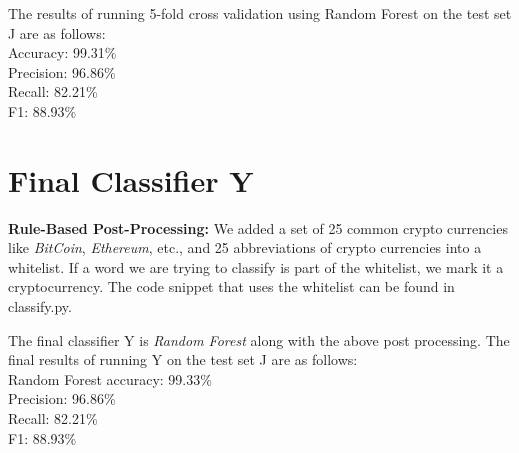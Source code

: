 \documentclass[12pt,letterpaper]{article}
\begin{document}
The results of running 5-fold cross validation using Random Forest on the test set J are as follows:\\
Accuracy: 99.31\%\\
Precision: 96.86\%\\
Recall: 82.21\%\\
F1: 88.93\%\\


\section*{Final Classifier Y}
\textbf{Rule-Based Post-Processing:} We added a set of 25 common crypto currencies like \textit{BitCoin}, \textit{Ethereum}, etc., and 25 abbreviations of crypto currencies into a whitelist. If a word we are trying to classify is part of the whitelist, we mark it a cryptocurrency. The code snippet that uses the whitelist can be found in classify.py.

The final classifier Y  is \textit{Random Forest} along with the above post processing. The final results of running Y on the test set J are as follows:\\
Random Forest accuracy: 99.33\%\\
Precision: 96.86\%\\
Recall: 82.21\%\\
F1: 88.93\%\\


{\small
%
%
}
\end{document}
